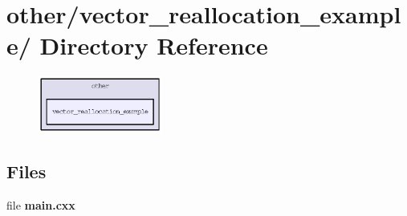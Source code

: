 \section{other/vector\_\-reallocation\_\-example/ Directory Reference}
\label{dir_29a213b76c4a70009011f1d4243dcea6}


\begin{figure}[H]
\begin{center}
\leavevmode
\includegraphics[width=115pt]{dir_29a213b76c4a70009011f1d4243dcea6_dep}
\end{center}
\end{figure}
\subsection*{Files}
\begin{CompactItemize}
\item 
file \textbf{main.cxx}
\end{CompactItemize}
